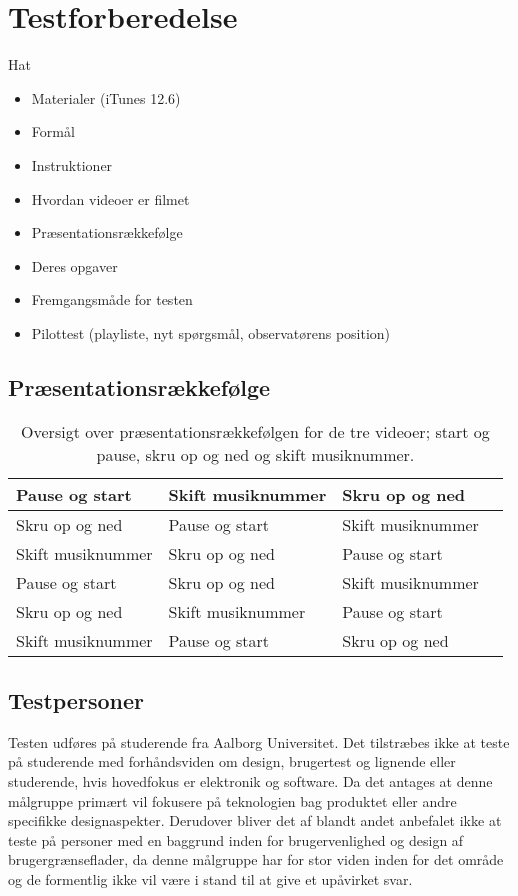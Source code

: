 \section{Testforberedelse}
\label{Testforberedelse}
%
Hat
%
\begin{itemize}
  \item Materialer (iTunes 12.6)
  \item Formål
  \item Instruktioner
  \item Hvordan videoer er filmet
  \item Præsentationsrækkefølge 
  \item Deres opgaver
  \item Fremgangsmåde for testen 
  \item Pilottest (playliste, nyt spørgsmål, observatørens position)
\end{itemize}
%
\subsection{Præsentationsrækkefølge}
\label{PraesentationsraekkefoelgeValgAfGestikker}
%


%
\begin{table}[H]
	\centering
	\begin{tabular}{ | l | l | l | p{8cm} |}
		\hline
		Pause og start & Skift musiknummer & Skru op og ned \\ \hline
		Skru op og ned & Pause og start & Skift musiknummer\\ \hline
		Skift musiknummer & Skru op og ned & Pause og start \\ \hline
		Pause og start & Skru op og ned & Skift musiknummer\\ \hline
		Skru op og ned & Skift musiknummer & Pause og start\\ \hline
		Skift musiknummer & Pause og start & Skru op og ned \\ \hline
	\end{tabular}
	\caption{Oversigt over præsentationsrækkefølgen for de tre videoer; start og pause, skru op og ned og skift musiknummer.}
	\label{tab:PraesentationsraekkefoelgeValgAfGestikker}
\end{table}
\noindent
%

\subsection{Testpersoner}
\label{TestpersonerValgAfGestikker}
%
Testen udføres på studerende fra Aalborg Universitet. Det tilstræbes ikke at teste på studerende med forhåndsviden om design, brugertest og lignende eller studerende, hvis hovedfokus er elektronik og software. Da det antages at denne målgruppe primært vil fokusere på teknologien bag produktet eller andre specifikke designaspekter. Derudover bliver det af \textcite[s. 110]{Book:OUE} blandt andet anbefalet ikke at teste på personer med en baggrund inden for brugervenlighed og design af brugergrænseflader, da denne målgruppe har for stor viden inden for det område og de formentlig ikke vil være i stand til at give et upåvirket svar.

